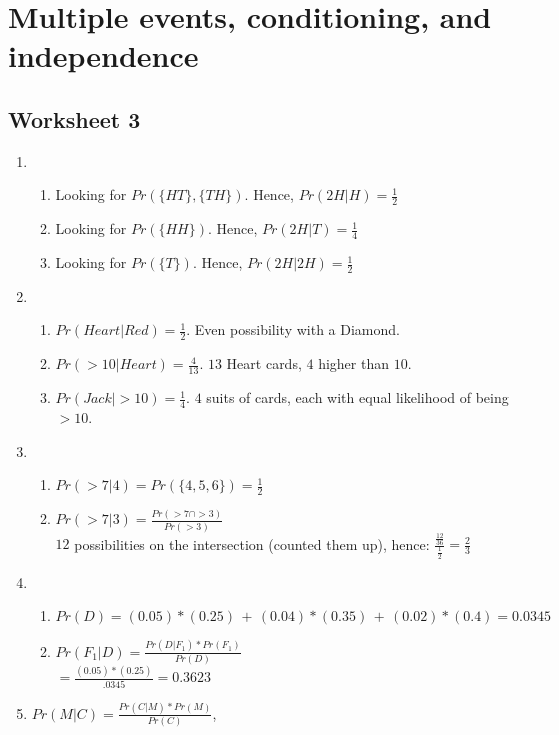 \documentclass[12pt]{article}
\theoremstyle{plain}
\theoremstyle{definition}
\numberwithin{equation}{theorem}
\begin{document}
\bigskip

\section{Multiple events, conditioning, and independence}
\subsection{Worksheet 3}
\begin{enumerate}
\item
	\begin{enumerate}
	\item Looking for $Pr(\{HT\},\{TH\})$. Hence, $Pr(2H|H) = \frac{1}{2}$
	\item Looking for $Pr(\{HH\})$. Hence, $Pr(2H|T) = \frac{1}{4}$
	\item Looking for $Pr(\{T\})$. Hence, $Pr(2H|2H) = \frac{1}{2}$
	\end{enumerate}
\addtocounter{enumi}{3}
\item
	\begin{enumerate}
	\item $Pr(Heart|Red) = \frac{1}{2}$. Even possibility with a Diamond.
	\item $Pr(>10|Heart) = \frac{4}{13}$. $13$ Heart cards, $4$ higher than $10$.
	\item $Pr(Jack|>10) = \frac{1}{4}$. $4$ suits of cards, each with equal likelihood of being $> 10$.
	\end{enumerate}
\addtocounter{enumi}{1}
\item
	\begin{enumerate}
	\item $Pr(>7|4) = Pr(\{4,5,6\}) = \frac{1}{2}$ 
	\addtocounter{enumii}{1}
	\item $Pr(>7|3) = \frac{Pr(>7 \cap >3)}{Pr(>3)}$\\
	$12$ possibilities on the intersection (counted them up), hence: $\frac{\frac{12}{36}}{\frac{1}{2}} = \frac{2}{3}$
	\end{enumerate}
\addtocounter{enumi}{1}
\item 
	\begin{enumerate}
	\item $Pr(D) = (0.05)*(0.25)\, + \, (0.04)*(0.35)\, + \, (0.02)*(0.4) = 0.0345$
	\item $Pr(F_{1}|D) = \frac{Pr(D|F_{1})*Pr(F_{1})}{Pr(D)}$\\
	$= \frac{(0.05)*(0.25)}{.0345} = 0.3623$
	\end{enumerate}
\item $Pr(M|C) = \frac{Pr(C|M)*Pr(M)}{Pr(C)}$,\\

\end{enumerate}
\end{document}
